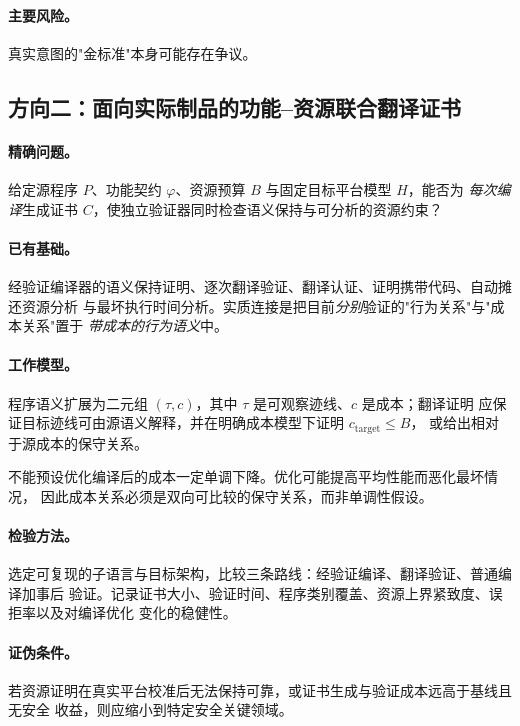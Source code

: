 \paragraph{主要风险。}
真实意图的"金标准"本身可能存在争议。

\subsection*{方向二：面向实际制品的功能--资源联合翻译证书}

\paragraph{精确问题。}
给定源程序 $P$、功能契约 $\varphi$、资源预算 $B$ 与固定目标平台模型 $H$，能否为
\emph{每次编译}生成证书 $C$，使独立验证器同时检查语义保持与可分析的资源约束？

\paragraph{已有基础。}
经验证编译器的语义保持证明、逐次翻译验证、翻译认证、证明携带代码、自动摊还资源分析
与最坏执行时间分析。实质连接是把目前\emph{分别}验证的"行为关系"与"成本关系"置于
\emph{带成本的行为语义}中。

\paragraph{工作模型。}
程序语义扩展为二元组 $(\tau, c)$，其中 $\tau$ 是可观察迹线、$c$ 是成本；翻译证明
应保证目标迹线可由源语义解释，并在明确成本模型下证明 $c_{\text{target}} \le B$，
或给出相对于源成本的保守关系。

\begin{remark}[一个必须避免的假设]
不能预设优化编译后的成本一定单调下降。优化可能提高平均性能而恶化最坏情况，
因此成本关系必须是双向可比较的保守关系，而非单调性假设。
\end{remark}

\paragraph{检验方法。}
选定可复现的子语言与目标架构，比较三条路线：经验证编译、翻译验证、普通编译加事后
验证。记录证书大小、验证时间、程序类别覆盖、资源上界紧致度、误拒率以及对编译优化
变化的稳健性。

\paragraph{证伪条件。}
若资源证明在真实平台校准后无法保持可靠，或证书生成与验证成本远高于基线且无安全
收益，则应缩小到特定安全关键领域。

